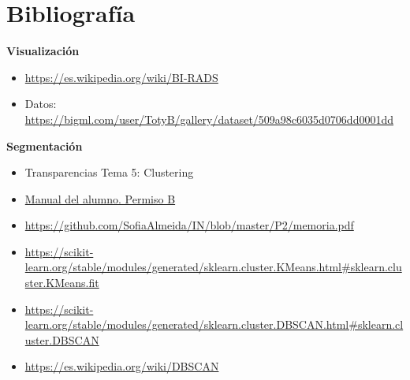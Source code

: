 \documentclass[a4]{article}
\begin{document}
\section{Bibliografía}

\textbf{Visualización}
\begin{itemize}
\item \href{https://es.wikipedia.org/wiki/BI-RADS}{https://es.wikipedia.org/wiki/BI-RADS}
\item Datos: \href{https://bigml.com/user/TotyB/gallery/dataset/509a98c6035d0706dd0001dd}{https://bigml.com/user/TotyB/gallery/dataset/509a98c6035d0706dd0001dd}
\end{itemize}
\textbf{Segmentación}
\begin{itemize}
\item Transparencias Tema 5: Clustering
\item \href{https://www.todostuslibros.com/libros/manual-del-alumno-permiso-b-facilauto_978-84-09-08551-4}{Manual del alumno. Permiso B}
\item \href{https://github.com/SofiaAlmeida/IN/blob/master/P2/memoria.pdf}{https://github.com/SofiaAlmeida/IN/blob/master/P2/memoria.pdf}
\item \href{https://scikit-learn.org/stable/modules/generated/sklearn.cluster.KMeans.html\#sklearn.cluster.KMeans.fit}{https://scikit-learn.org/stable/modules/generated/sklearn.cluster.KMeans.html\#sklearn.cluster.KMeans.fit}
\item \href{https://scikit-learn.org/stable/modules/generated/sklearn.cluster.DBSCAN.html\#sklearn.cluster.DBSCAN}{https://scikit-learn.org/stable/modules/generated/sklearn.cluster.DBSCAN.html\#sklearn.cluster.DBSCAN}
\item \href{https://es.wikipedia.org/wiki/DBSCAN}{https://es.wikipedia.org/wiki/DBSCAN}
\end{itemize}
\end{document}
